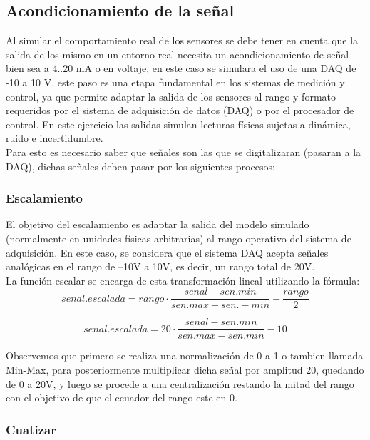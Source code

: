 \documentclass[conference]{IEEEtran}
\begin{document}
\subsection{Acondicionamiento de la señal}

Al simular el comportamiento real de los sensores se debe tener en cuenta que la salida de los mismo en un entorno real necesita un acondicionamiento de señal bien sea a 4..20 mA o en voltaje, en este caso se simulara el uso de una DAQ de -10 a 10 V, este paso es una etapa fundamental en los sistemas de medición y control, ya que permite adaptar la salida de los sensores al rango y formato requeridos por el sistema de adquisición de datos (DAQ) o por el procesador de control. En este ejercicio las salidas simulan lecturas físicas sujetas a dinámica, ruido e incertidumbre.\\

Para esto es necesario saber que señales son las que se digitalizaran (pasaran a la DAQ), dichas señales deben pasar por los siguientes procesos:\\

\subsubsection{Escalamiento}

El objetivo del escalamiento es adaptar la salida del modelo simulado (normalmente en unidades físicas arbitrarias) al rango operativo del sistema de adquisición. En este caso, se considera que el sistema DAQ acepta se\~nales analógicas en el rango de –10V a 10V, es decir, un rango total de 20V.\\

La función escalar se encarga de esta transformación lineal utilizando la fórmula:\\

\[
senal.escalada = rango \cdot \frac{senal-sen.min}{sen.max-sen.-min} - \frac{rango}{2}
\]

\[
senal.escalada = 20 \cdot \frac{senal-sen.min}{sen.max-sen.min} - 10
\]

Observemos que primero se realiza una normalización de 0 a 1 o tambien llamada Min-Max, para posteriormente multiplicar dicha señal por amplitud 20, quedando de 0 a 20V, y luego se procede a una centralización restando la mitad del rango con el objetivo de que el ecuador del rango este en 0.

\subsubsection{Cuatizar}
\end{document}

